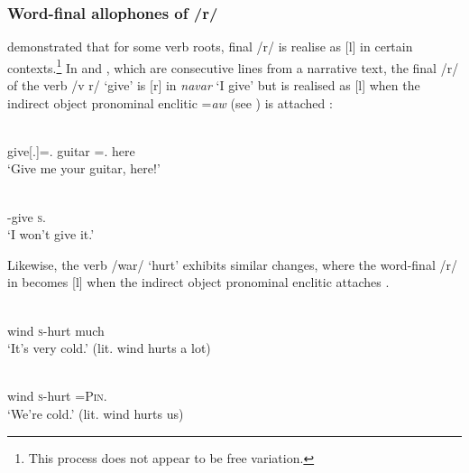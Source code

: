 \subsubsection{Word-final allophones of /r/}\label{sec:2.2.4.2}

\citet{FriesenMamalis2008} demonstrated that for some verb roots, final /r/ is realise as [l] in certain contexts.\footnote{This process does not appear to be free variation.} In  and , which are consecutive lines from a narrative text, the final /r/ of the verb /v r/\textit{ }‘give’ is [r] in  \textit{navar}\textit{ }‘I give’  but is realised as [l] when the indirect object pronominal enclitic =\textit{aw} (see ) is attached : 

\ea \label{ex:2:29}
\gll [vəl=aw                                  kɪndɛw    =aŋgʷɔ     na        ɛhɛ]\\
     {give[{\twoS}.{\IMP}]={\oneS}.{\IO}}      guitar    ={\twoS}.{\POSS}             {\PSP}  here\\
\glt  ‘Give me your guitar, here!’
\z

\ea \label{ex:2:30}
\\
      {\oneS}-give    \textsc{s}.{\DO}  {\NEG}\\
\glt  ‘I won’t give it.’  
\z

Likewise, the verb /war/ ‘hurt’ exhibits similar changes, where the word-final /r/ in  becomes [l] when the indirect object pronominal enclitic attaches . 

\ea \label{ex:2:31}
\\
      wind  \textsc{s}-hurt  much\\
\glt  ‘It’s very cold.’ (lit. wind hurts a lot)
\z

\ea \label{ex:2:32}
\gll  [həmaɗ   a-wal                          =alɔkʷɔ]\\
      wind  \textsc{s}-hurt  =\textsc{Pin}.{\IO}\\
\glt  ‘We’re cold.’ (lit. wind hurts us)
\z

